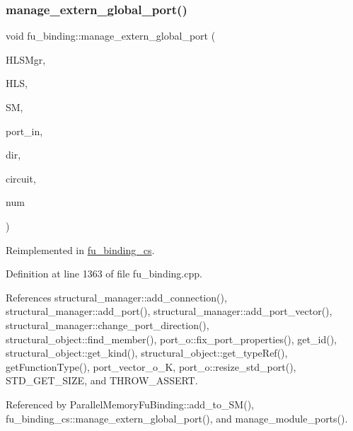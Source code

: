 \subsubsection{\texorpdfstring{manage\+\_\+extern\+\_\+global\+\_\+port()}{manage\_extern\_global\_port()}}
{\footnotesize\ttfamily void fu\+\_\+binding\+::manage\+\_\+extern\+\_\+global\+\_\+port (\begin{DoxyParamCaption}\item[{const \hyperlink{hls__manager_8hpp_acd3842b8589fe52c08fc0b2fcc813bfe}{H\+L\+S\+\_\+manager\+Ref}}]{H\+L\+S\+Mgr,  }\item[{const \hyperlink{hls_8hpp_a75d0c73923d0ddfa28c4843a802c73a7}{hls\+Ref}}]{H\+LS,  }\item[{const \hyperlink{structural__manager_8hpp_ab3136f0e785d8535f8d252a7b53db5b5}{structural\+\_\+manager\+Ref}}]{SM,  }\item[{\hyperlink{structural__objects_8hpp_a8ea5f8cc50ab8f4c31e2751074ff60b2}{structural\+\_\+object\+Ref}}]{port\+\_\+in,  }\item[{unsigned int}]{dir,  }\item[{\hyperlink{structural__objects_8hpp_a8ea5f8cc50ab8f4c31e2751074ff60b2}{structural\+\_\+object\+Ref}}]{circuit,  }\item[{unsigned int}]{num }\end{DoxyParamCaption})\hspace{0.3cm}{\ttfamily [virtual]}}



Reimplemented in \hyperlink{classfu__binding__cs_a2c94fa860b8c7ca4d4bac3c107faa957}{fu\+\_\+binding\+\_\+cs}.



Definition at line 1363 of file fu\+\_\+binding.\+cpp.



References structural\+\_\+manager\+::add\+\_\+connection(), structural\+\_\+manager\+::add\+\_\+port(), structural\+\_\+manager\+::add\+\_\+port\+\_\+vector(), structural\+\_\+manager\+::change\+\_\+port\+\_\+direction(), structural\+\_\+object\+::find\+\_\+member(), port\+\_\+o\+::fix\+\_\+port\+\_\+properties(), get\+\_\+id(), structural\+\_\+object\+::get\+\_\+kind(), structural\+\_\+object\+::get\+\_\+type\+Ref(), get\+Function\+Type(), port\+\_\+vector\+\_\+o\+\_\+K, port\+\_\+o\+::resize\+\_\+std\+\_\+port(), S\+T\+D\+\_\+\+G\+E\+T\+\_\+\+S\+I\+ZE, and T\+H\+R\+O\+W\+\_\+\+A\+S\+S\+E\+RT.



Referenced by Parallel\+Memory\+Fu\+Binding\+::add\+\_\+to\+\_\+\+S\+M(), fu\+\_\+binding\+\_\+cs\+::manage\+\_\+extern\+\_\+global\+\_\+port(), and manage\+\_\+module\+\_\+ports().

